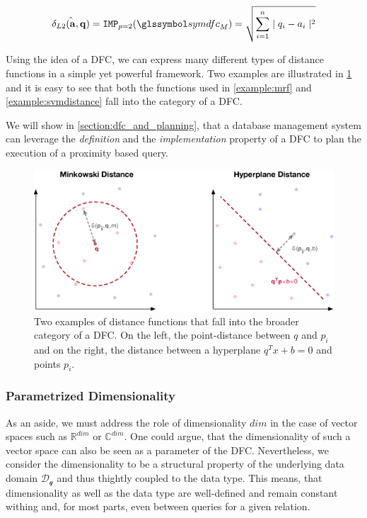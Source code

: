 \begin{equation}
    \hat{\delta_{L2}(\mathbf{a},\mathbf{q})} = \texttt{IMP}_{p=2}(\symdfc_M) = \sqrt{\sum_{i=1}^{n} \mid q_i - a_i \mid^2}
\end{equation}

Using the idea of a DFC, we can express many different types of distance functions in a simple yet powerful framework. Two examples are illustrated in \cref{figure:distance_computation} and it is easy to see that both the functions used in \cref{example:mrf} and \cref{example:svmdistance} fall into the category of a DFC.

We will show in \cref{section:dfc_and_planning}, that a database management system can leverage the \emph{definition} and the \emph{implementation} property of a DFC to plan the execution of a proximity based query.

\begin{figure}[bt]
    \centering
    \includegraphics[width=\textwidth]{figures/distance_computations.eps}
    \caption{Two examples of distance functions that fall into the broader category of a DFC. On the left, the point-distance between $q$ and $p_i$ and on the right, the distance between a hyperplane $q^Tx+b = 0$ and points $p_i$.}
    \label{figure:distance_computation}
\end{figure}

\subsubsection{Parametrized Dimensionality}
As an aside, we must address the role of dimensionality $dim$ in the case of vector spaces such as $\mathbb{R}^{dim}$ or $\mathbb{C}^{dim}$. One could argue, that the dimensionality of such a vector space can also be seen as a parameter of the DFC. Nevertheless, we consider the dimensionality to be a structural property of the underlying data domain $\mathcal{D_q}$ and thus thightly coupled to the data type. This means, that dimensionality as well as the data type are well-defined and remain constant withing and, for most parts, even between queries for a given relation.

